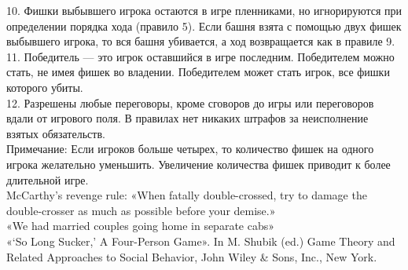 \begin{problem}
10. Фишки выбывшего игрока остаются в игре пленниками, но игнорируются при определении порядка хода (правило 5). Если башня взята с помощью двух фишек выбывшего игрока, то вся башня убивается, а ход возвращается как в правиле 9.\\
11. Победитель — это игрок оставшийся в игре последним. Победителем можно стать, не имея фишек во владении. Победителем может стать игрок, все фишки которого убиты.\\
12. Разрешены любые переговоры, кроме сговоров до игры или переговоров вдали от игрового поля. В правилах нет никаких штрафов за неисполнение взятых обязательств.\\
Примечание: Если игроков больше четырех, то количество фишек на одного игрока желательно уменьшить. Увеличение количества фишек приводит к более длительной игре.\\
McCarthy's revenge rule: «When fatally double-crossed, try to damage the double-crosser as much as possible before your demise.»\\
«We had married couples going home in separate cabs»\\
«`So Long Sucker,' A Four-Person Game». In M. Shubik (ed.) Game Theory and Related Approaches to Social Behavior, John Wiley \& Sons, Inc., New York.



\begin{sol}

\end{sol}
\end{problem}






